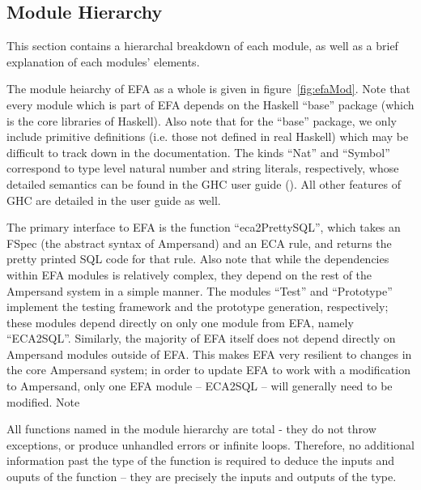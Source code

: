 \documentclass[12pt, svgnames]{article}
\let\Oldsubsection\subsection
\renewcommand{\subsection}{\FloatBarrier\Oldsubsection}
\begin{document}
\subsection{Module Hierarchy}

This section contains a hierarchal breakdown of each module, as well as a brief
explanation of each modules' elements. 

The module heiarchy of EFA as a whole is given in figure~\ref{fig:efaMod}. Note
that every module which is part of EFA depends on the
Haskell ``base'' package (which is the core libraries of Haskell). Also note
that for the ``base'' package, we only include primitive definitions (i.e. those
not defined in real Haskell) which may be difficult to track down in the
documentation. The kinds ``Nat'' and ``Symbol'' correspond to type level natural
number and string literals, respectively, whose detailed semantics can be found
in the GHC user guide (\cite{ghcUserGuide}). All other features of GHC are
detailed in the user guide as well.

The primary interface to EFA is the function ``eca2PrettySQL'', which takes an
FSpec (the abstract syntax of Ampersand) and an ECA rule, and returns the pretty
printed SQL code for that rule. Also note that while the dependencies within EFA
modules is relatively complex, they depend on the rest of the Ampersand system
in a simple manner. The modules ``Test'' and ``Prototype'' implement the testing
framework and the prototype generation, respectively; these modules depend
directly on only one module from EFA, namely ``ECA2SQL''. Similarly, the
majority of EFA itself does not depend directly on Ampersand modules outside of
EFA. This makes EFA very resilient to changes in the core Ampersand system; in
order to update EFA to work with a modification to Ampersand, only one EFA
module -- ECA2SQL -- will generally need to be modified. Note

All functions named in the module hierarchy are total - they do not throw
exceptions, or produce unhandled errors or infinite loops. Therefore, no
additional information past the type of the function is required to deduce the
inputs and ouputs of the function -- they are precisely the inputs and outputs
of the type.
\end{document}
